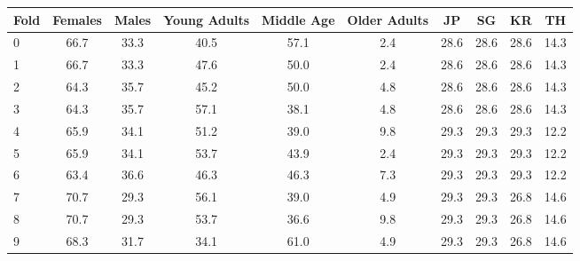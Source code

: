 \begin{tabular}{lccccccccc}
\toprule
Fold & Females & Males & Young Adults & Middle Age & Older Adults & JP & SG & KR & TH \\
\midrule
0 & 66.7 & 33.3 & 40.5 & 57.1 & 2.4 & 28.6 & 28.6 & 28.6 & 14.3 \\
1 & 66.7 & 33.3 & 47.6 & 50.0 & 2.4 & 28.6 & 28.6 & 28.6 & 14.3 \\
2 & 64.3 & 35.7 & 45.2 & 50.0 & 4.8 & 28.6 & 28.6 & 28.6 & 14.3 \\
3 & 64.3 & 35.7 & 57.1 & 38.1 & 4.8 & 28.6 & 28.6 & 28.6 & 14.3 \\
4 & 65.9 & 34.1 & 51.2 & 39.0 & 9.8 & 29.3 & 29.3 & 29.3 & 12.2 \\
5 & 65.9 & 34.1 & 53.7 & 43.9 & 2.4 & 29.3 & 29.3 & 29.3 & 12.2 \\
6 & 63.4 & 36.6 & 46.3 & 46.3 & 7.3 & 29.3 & 29.3 & 29.3 & 12.2 \\
7 & 70.7 & 29.3 & 56.1 & 39.0 & 4.9 & 29.3 & 29.3 & 26.8 & 14.6 \\
8 & 70.7 & 29.3 & 53.7 & 36.6 & 9.8 & 29.3 & 29.3 & 26.8 & 14.6 \\
9 & 68.3 & 31.7 & 34.1 & 61.0 & 4.9 & 29.3 & 29.3 & 26.8 & 14.6 \\
\bottomrule
\end{tabular}
